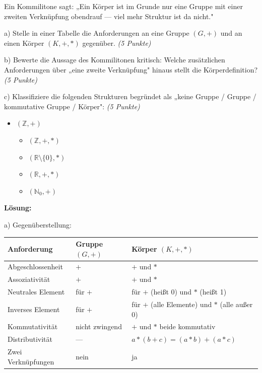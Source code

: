 \documentclass[11pt, a4paper]{article}
\begin{document}
Ein Kommilitone sagt: „Ein Körper ist im Grunde nur eine Gruppe mit einer zweiten Verknüpfung obendrauf — viel mehr Struktur ist da nicht."


a) Stelle in einer Tabelle die Anforderungen an eine Gruppe $(G, +)$ und an einen Körper $(K, +, \ast)$ gegenüber. \textit{(5 Punkte)}


b) Bewerte die Aussage des Kommilitonen kritisch: Welche zusätzlichen Anforderungen über „eine zweite Verknüpfung" hinaus stellt die Körperdefinition? \textit{(5 Punkte)}


c) Klassifiziere die folgenden Strukturen begründet als „keine Gruppe / Gruppe / kommutative Gruppe / Körper": \textit{(5 Punkte)}

\begin{itemize}
  \item $(\mathbb{Z}, +)$
\begin{itemize}
  \item $(\mathbb{Z}, +, \ast)$
  \item $(\mathbb{R} \setminus \{0\}, \ast)$
  \item $(\mathbb{R}, +, \ast)$
  \item $(\mathbb{N}_0, +)$
\end{itemize}
\end{itemize}

\textbf{Lösung:}


a) Gegenüberstellung:



{\small
\begin{tabularx}{\linewidth}{XXX}
\hline
\rowcolor{tableheadbg}
{\color{white}\textbf{Anforderung}} & {\color{white}\textbf{Gruppe $(G,+)$}} & {\color{white}\textbf{Körper $(K,+,\ast)$}} \\[2pt]
\hline
\endhead
\hline
\endfoot
Abgeschlossenheit & $+$ & $+$ und $\ast$ \\
Assoziativität & $+$ & $+$ und $\ast$ \\
Neutrales Element & für $+$ & für $+$ (heißt 0) und $\ast$ (heißt 1) \\
Inverses Element & für $+$ & für $+$ (alle Elemente) und $\ast$ (alle außer 0) \\
Kommutativität & nicht zwingend & $+$ und $\ast$ beide kommutativ \\
Distributivität & — & $a\ast(b+c) = (a\ast b)+(a\ast c)$ \\
Zwei Verknüpfungen & nein & ja \\
\end{tabularx}
}
\end{document}

